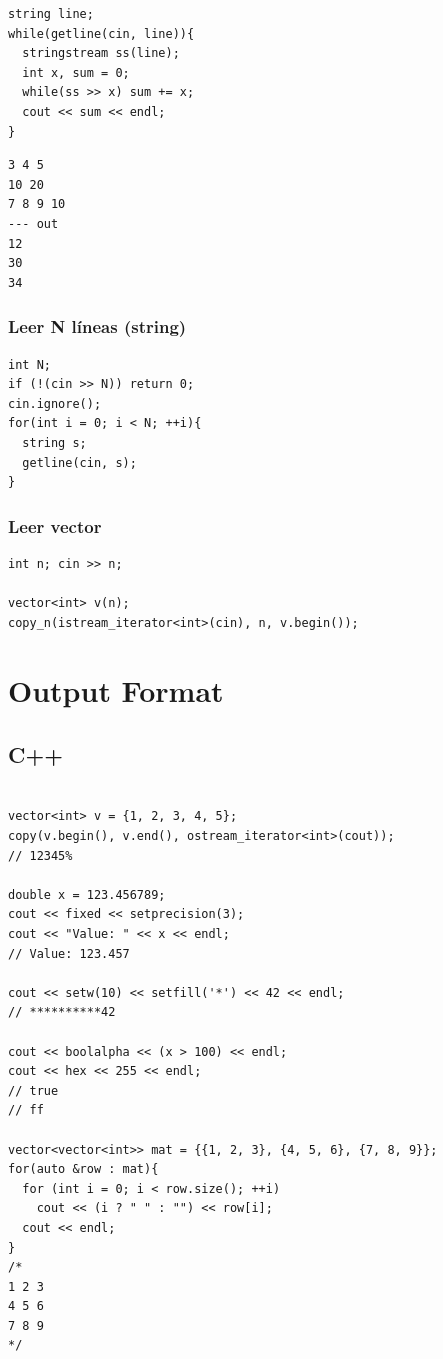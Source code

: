 \documentclass{article}
\begin{document}
\begin{lstlisting}[style=cppstyle]
string line;
while(getline(cin, line)){
  stringstream ss(line);
  int x, sum = 0;
  while(ss >> x) sum += x;
  cout << sum << endl;
}
\end{lstlisting}

\begin{lstlisting}
3 4 5
10 20
7 8 9 10
--- out
12
30
34

\end{lstlisting}

\subsubsection{Leer N líneas (string)}

\begin{lstlisting}[style=cppstyle]
int N;
if (!(cin >> N)) return 0;
cin.ignore();
for(int i = 0; i < N; ++i){
  string s;
  getline(cin, s);
}
\end{lstlisting}


\subsubsection{Leer vector}

\begin{lstlisting}[style=cppstyle]
int n; cin >> n;

vector<int> v(n);
copy_n(istream_iterator<int>(cin), n, v.begin());

\end{lstlisting}


\section{Output Format}


\subsection{C++}

\begin{lstlisting}[style=cppstyle]

vector<int> v = {1, 2, 3, 4, 5};
copy(v.begin(), v.end(), ostream_iterator<int>(cout));
// 12345%

double x = 123.456789;
cout << fixed << setprecision(3);
cout << "Value: " << x << endl;
// Value: 123.457

cout << setw(10) << setfill('*') << 42 << endl;
// **********42

cout << boolalpha << (x > 100) << endl;
cout << hex << 255 << endl;
// true
// ff

vector<vector<int>> mat = {{1, 2, 3}, {4, 5, 6}, {7, 8, 9}};
for(auto &row : mat){
  for (int i = 0; i < row.size(); ++i)
    cout << (i ? " " : "") << row[i];
  cout << endl;
}
/*
1 2 3
4 5 6
7 8 9
*/
\end{lstlisting}
\end{document}
